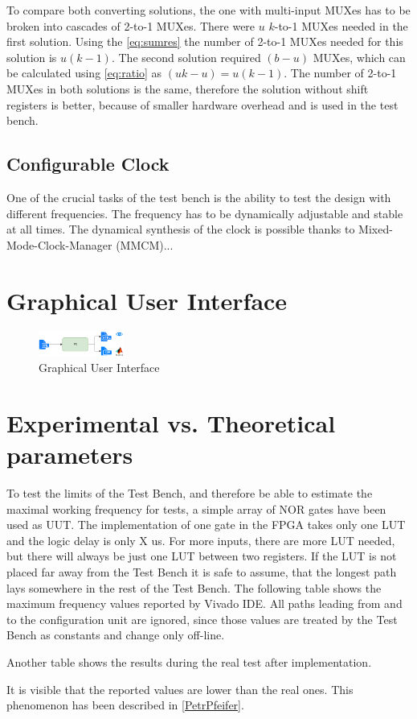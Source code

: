 To compare both converting solutions, the one with multi-input MUXes has to be broken into cascades of 2-to-1 MUXes. There were $u$ $k$-to-1 MUXes needed in the first solution. Using the \autoref*{eq:sumres} the number of 2-to-1 MUXes needed for this solution is $u(k-1)$. The second solution required $(b-u)$ MUXes, which can be calculated using \autoref*{eq:ratio} as $(uk-u)=u(k-1)$. The number of 2-to-1 MUXes in both solutions is the same, therefore the solution without shift registers is better, because of smaller hardware overhead and is used in the test bench.

\subsection{Configurable Clock}
One of the crucial tasks of the test bench is the ability to test the design with different frequencies. The frequency has to be dynamically adjustable and stable at all times. The dynamical synthesis of the clock is possible thanks to Mixed-Mode-Clock-Manager (MMCM)...

\section{Graphical User Interface}

\begin{figure}[h]
\centering
\includegraphics[width=0.25\textwidth]{figures/PC.png}
\caption{Graphical User Interface}
\label{fig:gui}
\end{figure}

\section{Experimental vs. Theoretical parameters}
To test the limits of the Test Bench, and therefore be able to estimate the maximal working frequency for tests, a simple array of NOR gates have been used as UUT. The implementation of one gate in the FPGA takes only one LUT and the logic delay is only X us. For more inputs, there are more LUT needed, but there will always be just one LUT between two registers. If the LUT is not placed far away from the Test Bench it is safe to assume, that the longest path lays somewhere in the rest of the Test Bench. The following table shows the maximum frequency values reported by Vivado IDE. All paths leading from and to the configuration unit are ignored, since those values are treated by the Test Bench as constants and change only off-line.

Another table shows the results during the real test after implementation.

It is visible that the reported values are lower than the real ones. This phenomenon has been described in \ref{PetrPfeifer}.